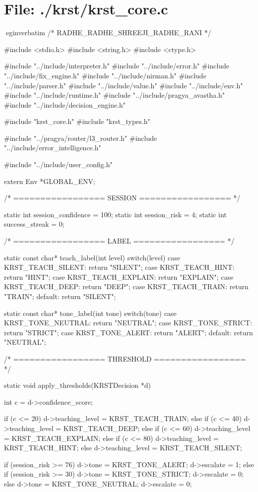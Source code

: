 \documentclass{article}
\begin{document}
\section*{File: ./krst/krst_core.c}
egin{verbatim}
/* RADHE_RADHE_SHREEJI_RADHE_RANI */

#include <stdio.h>
#include <string.h>
#include <ctype.h>

#include "../include/interpreter.h"
#include "../include/error.h"
#include "../include/fix_engine.h"
#include "../include/nirman.h"
#include "../include/parser.h"
#include "../include/value.h"
#include "../include/env.h"
#include "../include/runtime.h"
#include "../include/pragya_avastha.h"
#include "../include/decision_engine.h"

#include "krst_core.h"
#include "krst_types.h"

#include "../pragya/router/l3_router.h"
#include "../include/error_intelligence.h"

#include "../include/user_config.h"

extern Env *GLOBAL_ENV;

/* ================= SESSION ================= */

static int session_confidence = 100;
static int session_risk = 4;
static int success_streak = 0;

/* ================= LABEL ================= */

static const char* teach_label(int level)
{
    switch(level)
    {
        case KRST_TEACH_SILENT:  return "SILENT";
        case KRST_TEACH_HINT:    return "HINT";
        case KRST_TEACH_EXPLAIN: return "EXPLAIN";
        case KRST_TEACH_DEEP:    return "DEEP";
        case KRST_TEACH_TRAIN:   return "TRAIN";
        default: return "SILENT";
    }
}

static const char* tone_label(int tone)
{
    switch(tone)
    {
        case KRST_TONE_NEUTRAL: return "NEUTRAL";
        case KRST_TONE_STRICT:  return "STRICT";
        case KRST_TONE_ALERT:   return "ALERT";
        default: return "NEUTRAL";
    }
}

/* ================= THRESHOLD ================= */

static void apply_thresholds(KRSTDecision *d)
{
    int c = d->confidence_score;

    if (c <= 20)      d->teaching_level = KRST_TEACH_TRAIN;
    else if (c <= 40) d->teaching_level = KRST_TEACH_DEEP;
    else if (c <= 60) d->teaching_level = KRST_TEACH_EXPLAIN;
    else if (c <= 80) d->teaching_level = KRST_TEACH_HINT;
    else              d->teaching_level = KRST_TEACH_SILENT;

    if (session_risk >= 76)
    {
        d->tone = KRST_TONE_ALERT;
        d->escalate = 1;
    }
    else if (session_risk >= 30)
    {
        d->tone = KRST_TONE_STRICT;
        d->escalate = 0;
    }
    else
    {
        d->tone = KRST_TONE_NEUTRAL;
        d->escalate = 0;
    }
}
\end{document}

